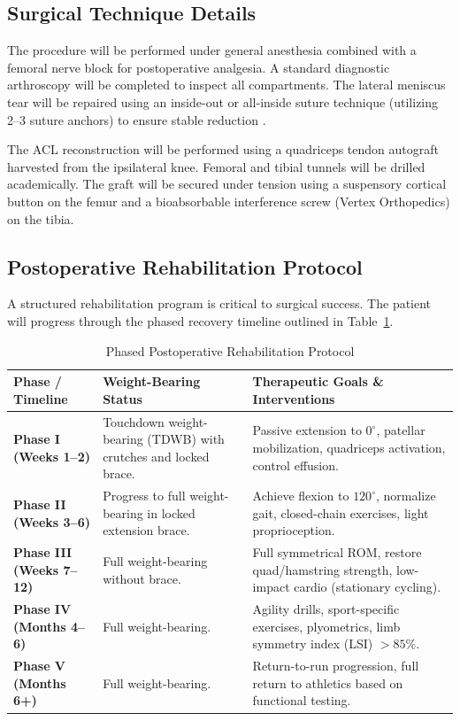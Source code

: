 \subsection{Surgical Technique Details}
The procedure will be performed under general anesthesia combined with a femoral nerve block for postoperative analgesia. A standard diagnostic arthroscopy will be completed to inspect all compartments. The lateral meniscus tear will be repaired using an inside-out or all-inside suture technique (utilizing 2--3 suture anchors) to ensure stable reduction \cite{vance2024meniscal}.

The ACL reconstruction will be performed using a quadriceps tendon autograft harvested from the ipsilateral knee. Femoral and tibial tunnels will be drilled academically. The graft will be secured under tension using a suspensory cortical button on the femur and a bioabsorbable interference screw (Vertex Orthopedics) on the tibia.

\subsection{Postoperative Rehabilitation Protocol}
A structured rehabilitation program is critical to surgical success. The patient will progress through the phased recovery timeline outlined in Table~\ref{tab:rehab_protocol}.

\begin{table}[h]
\centering
\caption{Phased Postoperative Rehabilitation Protocol}
\label{tab:rehab_protocol}
\begin{tabularx}{\textwidth}{lXX}
  \toprule
  \textbf{Phase / Timeline} & \textbf{Weight-Bearing Status} & \textbf{Therapeutic Goals \& Interventions} \\
  \midrule
  \textbf{Phase I (Weeks 1--2)} & Touchdown weight-bearing (TDWB) with crutches and locked brace. & Passive extension to $0^\circ$, patellar mobilization, quadriceps activation, control effusion. \\
  \textbf{Phase II (Weeks 3--6)} & Progress to full weight-bearing in locked extension brace. & Achieve flexion to $120^\circ$, normalize gait, closed-chain exercises, light proprioception. \\
  \textbf{Phase III (Weeks 7--12)} & Full weight-bearing without brace. & Full symmetrical ROM, restore quad/hamstring strength, low-impact cardio (stationary cycling). \\
  \textbf{Phase IV (Months 4--6)} & Full weight-bearing. & Agility drills, sport-specific exercises, plyometrics, limb symmetry index (LSI) $> 85\%$. \\
  \textbf{Phase V (Months 6+)} & Full weight-bearing. & Return-to-run progression, full return to athletics based on functional testing. \\
  \bottomrule
\end{tabularx}
\end{table}

